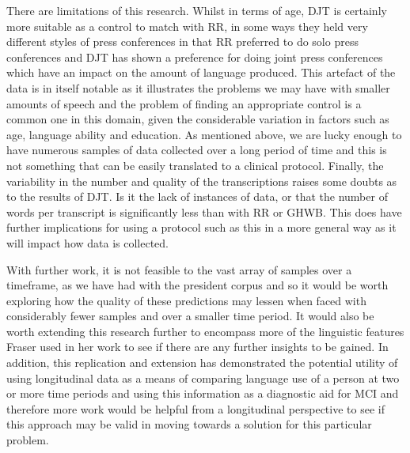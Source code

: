 \documentclass[10pt, letterpaper, twoside, openany]{thesis}
\begin{document}
There are limitations of this research. Whilst in terms of age, DJT is certainly more suitable as a control to match with RR, in some ways they held very different styles of press conferences in that RR preferred to do solo press conferences and DJT has shown a preference for doing joint press conferences which have an impact on the amount of language produced. This artefact of the data is in itself notable as it illustrates the problems we may have with smaller amounts of speech and the problem of finding an appropriate control is a common one in this domain, given the considerable variation in factors such as age, language ability and education. As mentioned above, we are lucky enough to have numerous samples of data collected over a long period of time and this is not something that can be easily translated to a clinical protocol. Finally, the variability in the number and quality of the transcriptions raises some doubts as to the results of DJT. Is it the lack of instances of data, or that the number of words per transcript is significantly less than with RR or GHWB. This does have further implications for using a protocol such as this in a more general way as it will impact how data is collected. 
\par 
With further work, it is not feasible to the vast array of samples over a timeframe, as we have had with the president corpus and so it would be worth exploring how the quality of these predictions may lessen when faced with considerably fewer samples and over a smaller time period. It would also be worth extending this research further to encompass more of the linguistic features Fraser used in her work \cite{Fraser2015} to see if there are any further insights to be gained. In addition, this replication and extension has demonstrated the potential utility of using longitudinal data as a means of comparing language use of a person at two or more time periods and using this information as a diagnostic aid for MCI and therefore more work would be helpful from a longitudinal perspective to see if this approach may be valid in moving towards a solution for this particular problem. 
\end{document}
